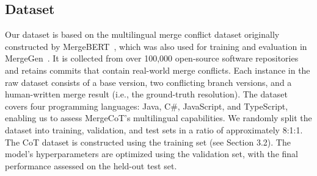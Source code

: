 \documentclass[sigconf,review,anonymous]{acmart}
\newcommand{\stma}[1]{\todo[inline]{\textcolor{black}{#1}}}
\begin{document}
\subsection{Dataset}

Our dataset is based on the multilingual merge conflict dataset originally constructed by MergeBERT~\cite{mergebert}, which was also used for training and evaluation in MergeGen~\cite{mergegen}. 
It is collected from over 100,000 open-source software repositories and retains commits that contain real-world merge conflicts.
Each instance in the raw dataset consists of a base version, two conflicting branch versions, and a human-written merge result (i.e., the ground-truth resolution). The dataset covers four programming languages: Java, C\#, JavaScript, and TypeScript, enabling us to assess MergeCoT’s multilingual capabilities. We randomly split the dataset into training, validation, and test sets in a ratio of approximately 8:1:1. The CoT dataset is constructed using the training set (see Section 3.2). The model’s hyperparameters are optimized using the validation set, with the final performance assessed on the held-out test set.
\end{document}
